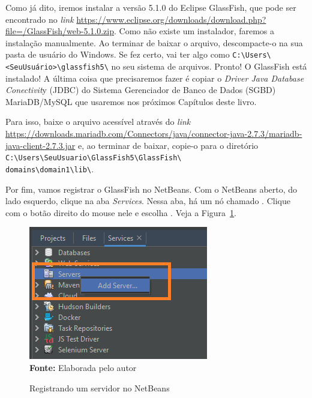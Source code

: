 Como já dito, iremos instalar a versão 5.1.0 do Eclipse GlassFish, que pode ser encontrado no \textit{link} 
\url{https://www.eclipse.org/downloads/download.php?file=/GlassFish/web-5.1.0.zip}. Como não existe um instalador, faremos a instalação manualmente. Ao terminar de baixar o arquivo, descompacte-o na sua pasta de usuário do Windows. Se fez certo, vai ter algo como \texttt{C:\textbackslash Users\textbackslash <SeuUsuário>\textbackslash glassfish5\textbackslash} no seu sistema de arquivos. Pronto! O GlassFish está instalado! A última coisa que precisaremos fazer é copiar o \textit{Driver Java Database Conectivit}y (JDBC) do Sistema Gerenciador de Banco de Dados (SGBD) MariaDB/MySQL que usaremos nos próximos Capítulos deste livro.

Para isso, baixe o arquivo acessível através do \textit{link} \url{https://downloads.mariadb.com/Connectors/java/connector-java-2.7.3/mariadb-java-client-2.7.3.jar} e, ao terminar de baixar, copie-o para o diretório \texttt{C:\textbackslash Users\textbackslash SeuUsuario\textbackslash GlassFish5\textbackslash GlassFish\textbackslash\\domains\textbackslash domain1\textbackslash lib\textbackslash}.

Por fim, vamos registrar o GlassFish no NetBeans. Com o NetBeans aberto, do lado esquerdo, clique na aba \textit{Services}. Nessa aba, há um nó chamado . Clique com o botão direito do mouse nele e escolha . Veja a Figura~\ref{fig:cap01Servers}.

\FloatBarrier
\begin{figure}[!htbp]
    \centering
    \caption{Registrando um servidor no NetBeans}
    \includegraphics[scale=0.7]{imagens/cap01Servers}
    \\\textbf{Fonte:} Elaborada pelo autor
    \label{fig:cap01Servers}
\end{figure}
\FloatBarrier

